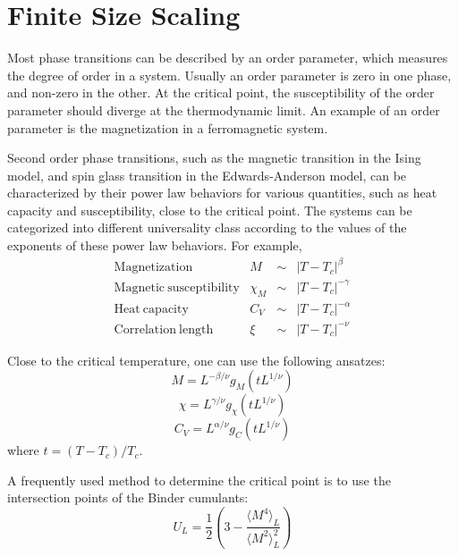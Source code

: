 \section{Finite Size Scaling}
Most phase transitions can be described by an order parameter, which measures
the degree of order in a system. Usually an order parameter is zero in one phase,
and non-zero in the other. At the critical point, the susceptibility of the order
parameter should diverge at the thermodynamic limit. An example of an order parameter is the 
magnetization in a ferromagnetic system. 
 
Second order phase transitions, such as the magnetic transition in the Ising model, and 
spin glass transition in the Edwards-Anderson model, can be characterized by their 
power law behaviors for various quantities, such as heat capacity and susceptibility,  
close to the critical point. The systems can be categorized into different universality 
class according to the values of the exponents of these power law behaviors. For example, 
\begin{equation}
  \label{eq:20}
  \begin{array}{lrcl}
    \mathrm{Magnetization}& M& \sim& \left|T-T_c\right|^\beta\\
    \mathrm{Magnetic~susceptibility}& \chi_M& \sim& \left|T-T_c\right|^{-\gamma}\\
    \mathrm{Heat~capacity}& C_V& \sim& \left|T-T_c\right|^{-\alpha}\\
    \mathrm{Correlation~length}& \xi& \sim& \left|T-T_c\right|^{-\nu}
  \end{array}
\end{equation}

Close to the critical temperature, one can use the following ansatzes:
\begin{equation}
  \label{eq:17}
  M=L^{-\beta/\nu}g_M(tL^{1/\nu})
\end{equation}
\begin{equation}
  \label{eq:19}
  \chi=L^{\gamma/\nu}g_\chi(tL^{1/\nu})
\end{equation}
\begin{equation}
  \label{eq:18}
  C_V=L^{\alpha/\nu}g_C(tL^{1/\nu})
\end{equation}
where $t=(T-T_c)/T_c$.

A frequently used method to determine the critical point is to use
the intersection points of the Binder cumulants:
\begin{equation}
  \label{eq:14}
  U_L=\frac{1}{2}\left(3-\frac{\langle M^4\rangle_L}{\langle M^2\rangle^2_L}\right)
\end{equation}

